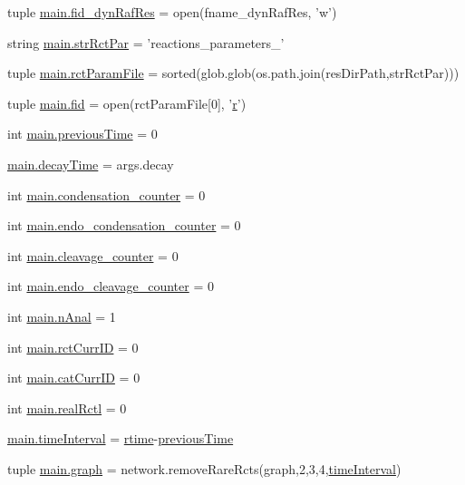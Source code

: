 \begin{DoxyCompactItemize}
\item 
tuple \hyperlink{a00122_aaff6b4fb4c2e2089c2a207a12f1757e3}{main.\-fid\-\_\-dyn\-Raf\-Res} = open(fname\-\_\-dyn\-Raf\-Res, 'w')
\item 
string \hyperlink{a00122_af48af84bff2351a55727aba6a63c1b52}{main.\-str\-Rct\-Par} = 'reactions\-\_\-parameters\-\_\-'
\item 
tuple \hyperlink{a00122_ac4e9cba2fd0b813ba19029541ad609e5}{main.\-rct\-Param\-File} = sorted(glob.\-glob(os.\-path.\-join(res\-Dir\-Path,str\-Rct\-Par)))
\item 
tuple \hyperlink{a00122_a68ab0ffa4b5ff1cceff01f4abe686ad0}{main.\-fid} = open(rct\-Param\-File\mbox{[}0\mbox{]}, '\hyperlink{a00024_ac862e7284527eb913b1351c8bfb8e079}{r}')
\item 
int \hyperlink{a00122_a6a6de947e3b6ada5ea6e761d208228bd}{main.\-previous\-Time} = 0
\item 
\hyperlink{a00122_a5517c07ae046c271d6291e9b3f7d139d}{main.\-decay\-Time} = args.\-decay
\item 
int \hyperlink{a00122_a358b60986e7e25df0dfb61562b7aa3e2}{main.\-condensation\-\_\-counter} = 0
\item 
int \hyperlink{a00122_a0521d81d319c4d79433b5fb65a6da1c2}{main.\-endo\-\_\-condensation\-\_\-counter} = 0
\item 
int \hyperlink{a00122_aba28788973ae3e9140b53078efe5d204}{main.\-cleavage\-\_\-counter} = 0
\item 
int \hyperlink{a00122_a17b22b48a2afe0223186b4275fe5ba70}{main.\-endo\-\_\-cleavage\-\_\-counter} = 0
\item 
int \hyperlink{a00122_ae7ca1c378927da05feb71e5a9f775afb}{main.\-n\-Anal} = 1
\item 
int \hyperlink{a00122_a53e397dea15f17442a198395e65b377b}{main.\-rct\-Curr\-I\-D} = 0
\item 
int \hyperlink{a00122_aa56c55225fa65fa569bd8d5f1063550e}{main.\-cat\-Curr\-I\-D} = 0
\item 
int \hyperlink{a00122_a2dcb93d1b24fce96491e031528ed43c0}{main.\-real\-Rctl} = 0
\item 
\hyperlink{a00122_a5ba0cd0b7538ed8047b2fea322ecb4b7}{main.\-time\-Interval} = \hyperlink{a00021_afc6b38657a313b9f1de2ee356910b6ee}{rtime}-\/\hyperlink{a00021_a17b8652a085b5add031a40fb1c9a680e}{previous\-Time}
\item 
tuple \hyperlink{a00122_a4cfdc01ecc5ad260a4f30c9353e3d856}{main.\-graph} = network.\-remove\-Rare\-Rcts(graph,2,3,4,\hyperlink{a00021_a430673c9821c17e4bf93cd42f59e00bb}{time\-Interval})

\end{DoxyCompactItemize}
